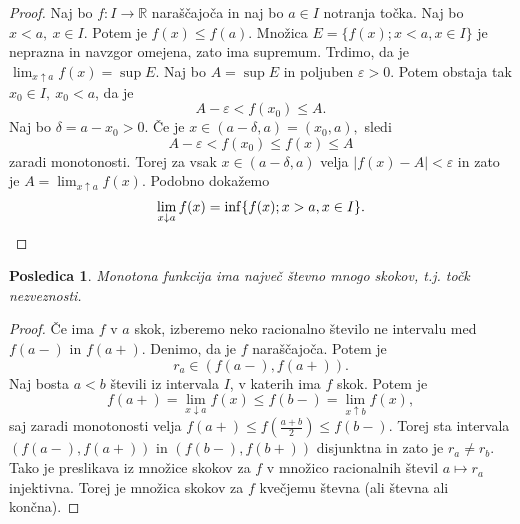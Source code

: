 \documentclass[10pt, a4paper]{article}
\newtheorem{posledica}[izr]{Posledica}
\newenvironment{noticeC}{%
  \tcolorbox[%
  notitle,
  empty,
  enhanced,  %
  breakable,
  coltext=black, 
  fontupper=\rmfamily,
  parbox=false,
  noparskip,
  sharp corners,
  boxrule=-1pt,  %
  frame hidden,
  left=7pt,  %
  right=7pt,
  top=5pt,
  bottom=5pt,
  before skip=2.5ex plus 2pt,
  after skip=2.5ex plus 2pt,
  overlay unbroken and last={%
  },
  ]}
{\endtcolorbox}
\newenvironment{dokaz}%
  {\begin{noticeC}\begin{proof}}%
  {\end{proof}\end{noticeC}}
\newcommand{\R}{\mathbb {R}}
\newcommand{\rlimf}[3]{\lim_{#1 \downarrow #2} {#3}}
\newcommand{\llimf}[3]{\lim_{#1 \uparrow #2} {#3}}
\begin{document}
\begin{dokaz}
    Naj bo $f: I \rightarrow \R$ naraščajoča in naj bo $a \in I$ notranja točka. Naj bo $x < a,\ x \in I$. Potem je $f(x) \leq f(a).$ Množica $E = \{f(x); x<a, x \in I\}$ je neprazna in navzgor omejena, zato ima supremum. 
    Trdimo, da je $\llimf{x}{a}{f(x)} = \sup E.$ Naj bo $A = \sup E$ in poljuben $\varepsilon >0$. Potem obstaja tak $x_0 \in I,\ x_0 < a$, da je $$A - \varepsilon < f(x_0) \leq A.$$ Naj bo $\delta = a - x_0 > 0$.
    Če je $x \in (a - \delta, a) = (x_0, a),$ sledi $$A - \varepsilon < f(x_0) \leq f(x) \leq A$$ zaradi monotonosti. Torej za vsak $x \in (a - \delta, a)$ velja $|f(x) - A| < \varepsilon$ in
    zato je $A = \llimf{x}{a}{f(x)}.$ Podobno dokažemo 
    \begin{equation*}
        \rlimf{x}{a}{f(x)} = \inf \{f(x); x>a, x \in I\}. \qedhere
    \end{equation*}
\end{dokaz}

\begin{posledica}
    Monotona funkcija ima največ števno mnogo skokov, t.j. točk nezveznosti.
\end{posledica}

\begin{dokaz}
    Če ima $f$ v $a$ skok, izberemo neko racionalno število ne intervalu med $f(a-)$ in $f(a+)$. Denimo, da je $f$ naraščajoča. Potem je $$r_a \in (f(a-), f(a+)).$$ Naj bosta $a<b$ števili iz intervala $I$, v katerih ima $f$ skok. 
    Potem je $$f(a+) = \rlimf{x}{a}{f(x)} \leq f(b-) = \llimf{x}{b}{f(x)},$$ saj zaradi monotonosti velja $f(a+) \leq f\left(\frac{a+b}{2}\right) \leq f(b-).$ 
    Torej sta intervala $(f(a-),f(a+))$ in $(f(b-), f(b+))$ disjunktna in zato je $r_a \neq r_b.$
    Tako je preslikava iz množice skokov za $f$ v množico racionalnih števil $a \mapsto r_a$ injektivna. Torej je množica skokov za $f$ kvečjemu števna (ali števna ali končna).
\end{dokaz}
\end{document}

